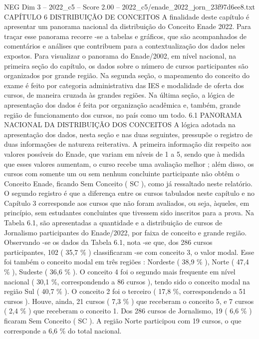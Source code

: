 \begin{textsample}{NEG Dim 3 – 2022\_c5 – Score 2.00 – 2022\_c5/enade\_2022\_jorn\_23f97d6ee8.txt}  \label{ex:f3_neg_222}
CAPÍTULO 6 DISTRIBUIÇÃO DE CONCEITOS A finalidade deste capítulo é apresentar um panorama nacional da distribuição do Conceito Enade 2022.
Para traçar esse panorama recorre -se a tabelas e gráficos, que são acompanhados de comentários e análises que contribuem para a contextualização dos dados neles expostos.
Para visualizar o panorama do Enade/2002, em nível nacional, na primeira seção do capítulo, os dados sobre o número de cursos participantes são organizados por grande região.
Na segunda seção, o mapeamento do conceito do exame é feito por categoria administrativa das IES e modalidade de oferta dos cursos, de maneira cruzada às grandes regiões.
Na última seção, a lógica de apresentação dos dados é feita por organização acadêmica e, também, grande região de funcionamento dos cursos, no país como um todo. 6.1 PANORAMA NACIONAL DA DISTRIBUIÇÃO DOS CONCEITOS A lógica adotada na apresentação dos dados, nesta seção e nas duas seguintes, pressupõe o registro de duas informações de natureza reiterativa.
A primeira informação diz respeito aos valores possíveis do Enade, que variam em níveis de 1 a 5, sendo que à medida que esses valores aumentam, o curso recebe uma avaliação melhor ; além disso, os cursos com somente um ou sem nenhum concluinte participante não obtêm o Conceito Enade, ficando Sem Conceito ( SC ), como já ressaltado neste relatório.
O segundo registro é que a diferença entre os cursos tabulados neste capítulo e no Capítulo 3 corresponde aos cursos que não foram avaliados, ou seja, àqueles, em princípio, sem estudantes concluintes que tivessem sido inscritos para a prova.
Na Tabela 6.1, são apresentadas a quantidade e a distribuição de cursos de Jornalismo participantes do Enade/2022, por faixa de conceito e grande região.
Observando -se os dados da Tabela 6.1, nota -se que, dos 286 cursos participantes, 102 ( 35,7 \% ) classificaram -se com conceito 3, o valor modal.
Esse foi também o conceito modal em três regiões : Nordeste ( 38,9 \% ), Norte ( 47,4 \% ), Sudeste ( 36,6 \% ).
O conceito 4 foi o segundo mais frequente em nível nacional ( 30,1 \%, correspondendo a 86 cursos ), tendo sido o conceito modal na região Sul ( 40,7 \% ).
O conceito 2 foi o terceiro ( 17,8 \%, correspondendo a 51 cursos ).
Houve, ainda, 21 cursos ( 7,3 \% ) que receberam o conceito 5, e 7 cursos ( 2,4 \% ) que receberam o conceito 1.
Dos 286 cursos de Jornalismo, 19 ( 6,6 \% ) ficaram Sem Conceito ( SC ).
A região Norte participou com 19 cursos, o que corresponde a 6,6 \% do total nacional.

\end{textsample}
